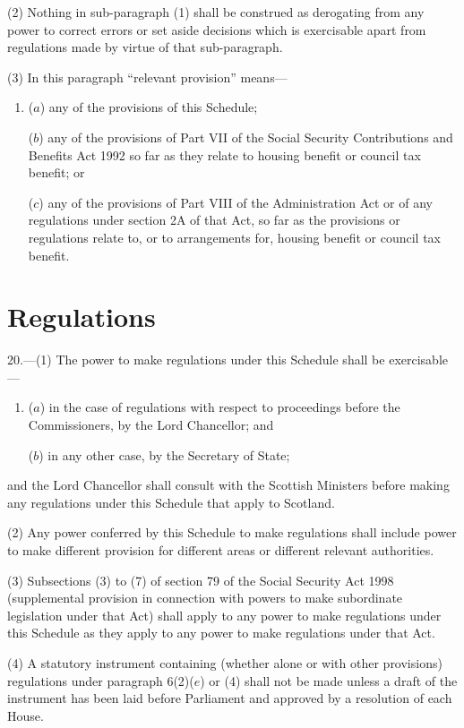 \documentclass[12pt,a4paper]{article}
\begin{document}
(2) Nothing in sub-paragraph (1)  shall be construed as derogating from any power to correct errors or set aside decisions which is exercisable apart from regulations made by virtue of that sub-paragraph.

(3) In this paragraph “relevant provision” means—
\begin{enumerate}\item[]
($a$) any of the provisions of this Schedule;

($b$) any of the provisions of Part VII of the Social Security Contributions and Benefits Act 1992 so far as they relate to housing benefit or council tax benefit; or

($c$) any of the provisions of Part VIII of the Administration Act or of any regulations under section 2A of that Act, so far as the provisions or regulations relate to, or to arrangements for, housing benefit or council tax benefit.
\end{enumerate}

\section*{Regulations}

20.---(1) The power to make regulations under this Schedule shall be exercisable—
\begin{enumerate}\item[]
($a$) in the case of regulations with respect to proceedings before the Commissioners, by the Lord Chancellor; and

($b$) in any other case, by the Secretary of State;
\end{enumerate}
and the Lord Chancellor shall consult with the Scottish Ministers before making any regulations under this Schedule that apply to Scotland.

(2) Any power conferred by this Schedule to make regulations shall include power to make different provision for different areas or different relevant authorities.

(3) Subsections (3)  to (7)  of section 79 of the Social Security Act 1998 (supplemental provision in connection with powers to make subordinate legislation under that Act) shall apply to any power to make regulations under this Schedule as they apply to any power to make regulations under that Act.

(4) A statutory instrument containing (whether alone or with other provisions) regulations under paragraph 6(2)($e$)  or (4)  shall not be made unless a draft of the instrument has been laid before Parliament and approved by a resolution of each House.
\end{document}
